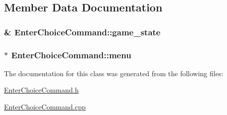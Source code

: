\subsection{Member Data Documentation}
\hypertarget{class_enter_choice_command_ae62848655ea22c482e3b0231b2db296f}{}
\subsubsection[{game\+\_\+state}]{\& Enter\+Choice\+Command\+::game\+\_\+state\hspace{0.3cm}{\ttfamily [protected]}}\label{class_enter_choice_command_ae62848655ea22c482e3b0231b2db296f}
\hypertarget{class_enter_choice_command_abf91b40b9f53c09048e23830e37f1fe0}{}
\subsubsection[{menu}]{$\ast$ Enter\+Choice\+Command\+::menu\hspace{0.3cm}{\ttfamily [protected]}}\label{class_enter_choice_command_abf91b40b9f53c09048e23830e37f1fe0}


The documentation for this class was generated from the following files\+:\begin{DoxyCompactItemize}
\item 
\hyperlink{_enter_choice_command_8h}{Enter\+Choice\+Command.\+h}\item 
\hyperlink{_enter_choice_command_8cpp}{Enter\+Choice\+Command.\+cpp}\end{DoxyCompactItemize}
